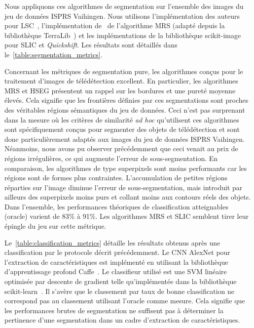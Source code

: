 Nous appliquons ces algorithmes de segmentation sur l'ensemble des images du jeu de données \gls{ISPRS} Vaihingen. Nous utilisons l'implémentation des auteurs pour \gls{LSC}~\cite{li_superpixel_2015}, l'implémentation de~\citet{guyet_extraction_2015} de l'algorithme \gls{MRS} (adapté depuis la bibliothèque TerraLib~\cite{camara_terralib_2008}) et les implémentations de la bibliothèque scikit-image~\cite{van_der_walt_scikit-image_2014} pour \gls{SLIC} et \emph{Quickshift}.
Les résultats sont détaillés dans le~\cref{table:segmentation_metrics}.

Concernant les métriques de segmentation pure, les algorithmes conçus pour le traitement d'images de télédétection excellent. En particulier, les algorithmes \gls{MRS} et \gls{HSEG} présentent un rappel sur les bordures et une pureté moyenne élevés. Cela signifie que les frontières définies par ces segmentations sont proches des véritables régions sémantiques du jeu de données. Ceci n'est pas surprenant dans la mesure où les critères de similarité \emph{ad hoc} qu'utilisent ces algorithmes sont spécifiquement conçus pour segmenter des objets de télédétection et sont donc particulièrement adaptés aux images du jeu de données \gls{ISPRS} Vaihingen. Néanmoins, nous avons pu observer précédemment que ceci venait au prix de régions irrégulières, ce qui augmente l'erreur de sous-segmentation. En comparaison, les algorithmes de type superpixels sont moins performants car les régions sont de formes plus contraintes. L'accumulation de petites régions réparties sur l'image diminue l'erreur de sous-segmentation, mais introduit par ailleurs des superpixels moins purs et collant moins aux contours réels des objets. Dans l'ensemble, les performances théoriques de classification atteignables (oracle) varient de 83\% à 91\%. Les algorithmes \gls{MRS} et \gls{SLIC} semblent tirer leur épingle du jeu sur cette métrique.

Le~\cref{table:classification_metrics} détaille les résultats obtenus après une classification par le protocole décrit précédemment. Le \gls{CNN} AlexNet pour l'extraction de caractéristiques est implémenté en utilisant la bibliothèque d'apprentissage profond Caffe~\cite{jia_caffe_2014}. Le classifieur utilisé est une \gls{SVM} linéaire optimisée par descente de gradient telle qu'implémentée dans la bibliothèque scikit-learn~\cite{pedregosa_scikit-learn_2011}.
Il s'avère que le classement par taux de bonne classification ne correspond pas au classement utilisant l'oracle comme mesure. Cela signifie que les performances brutes de segmentation ne suffisent pas à déterminer la pertinence d'une segmentation dans un cadre d'extraction de caractéristiques.

